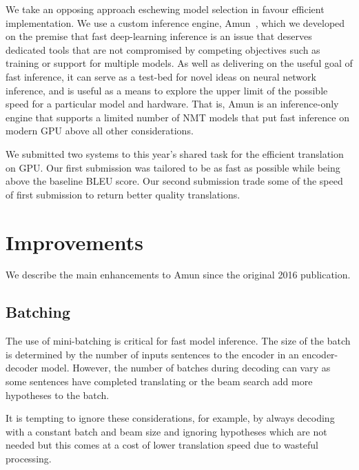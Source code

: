 \documentclass[11pt,a4paper]{article}
\begin{document}
We take an opposing approach eschewing model selection in favour efficient implementation. We use a custom inference engine, Amun~\citep{junczys2016neural}, which we developed on the premise that fast deep-learning inference is an issue that deserves dedicated tools that are not compromised by competing objectives such as training or support for multiple models. As well as delivering on the useful goal of fast inference, it can serve as a test-bed for novel ideas on neural network inference, and is useful as a means to explore the upper limit of the possible speed for a particular model and hardware. That is, Amun is an inference-only engine that supports a limited number of NMT models that put fast inference on modern GPU above all other considerations. %

We submitted two systems to this year's shared task for the efficient translation on GPU. Our first submission was tailored to be as fast as possible while being above the baseline BLEU score. Our second submission trade some of the speed of first submission to return better quality translations.



\section{Improvements}

We describe the main enhancements to Amun since the original 2016 publication.

\subsection{Batching}

The use of mini-batching is critical for fast model inference. The size of the batch is determined by the number of inputs sentences to the encoder in an encoder-decoder model. However, the number of batches during decoding can vary as some sentences have completed translating or the beam search add more hypotheses to the batch.

It is tempting to ignore these considerations, for example, by always decoding with a constant batch and beam size and ignoring hypotheses which are not needed but this comes at a cost of lower translation speed due to wasteful processing.
\end{document}
